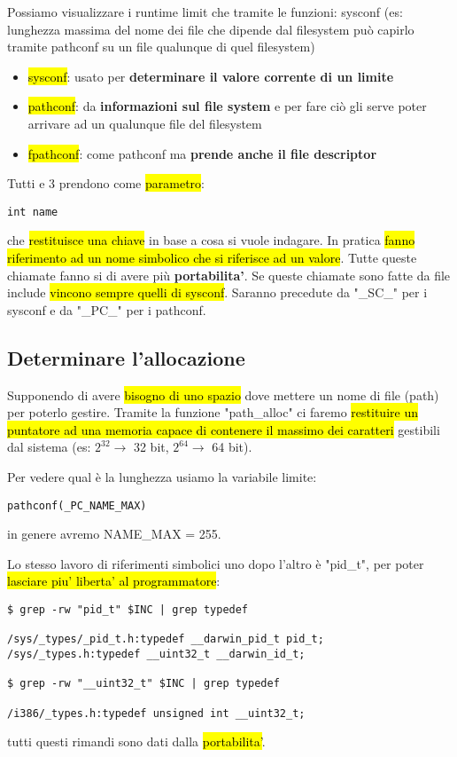 Possiamo visualizzare i runtime limit che tramite le funzioni: sysconf (es: lunghezza massima del nome dei file che dipende dal filesystem può capirlo tramite pathconf su un file qualunque di quel filesystem)

\begin{itemize}
	\item \hl{sysconf}: usato per \textbf{determinare il valore corrente di un limite}
	
	\item \hl{pathconf}: da \textbf{informazioni sul file system} e per fare ciò gli serve poter arrivare ad un qualunque file del filesystem
	
	\item \hl{fpathconf}: come pathconf ma \textbf{prende anche il file descriptor}
\end{itemize}

Tutti e 3 prendono come \hl{parametro}:

\begin{lstlisting}
int name
\end{lstlisting}

che \hl{restituisce una chiave} in base a cosa si vuole indagare. In pratica \hl{fanno riferimento ad un nome simbolico che si riferisce ad un valore}.
Tutte queste chiamate fanno si di avere più \textbf{portabilita'}. Se queste chiamate sono fatte da file include \hl{vincono sempre quelli di sysconf}. Saranno precedute da "\_SC\_" per i sysconf e da "\_PC\_" per i pathconf.


\subsection{Determinare l'allocazione}

Supponendo di avere \hl{bisogno di uno spazio} dove mettere un nome di file (path) per poterlo gestire. Tramite la funzione "path\_alloc" ci faremo \hl{restituire un puntatore ad una memoria capace di contenere il massimo dei caratteri} gestibili dal sistema (es: $2^32 \to$ 32 bit, $2^64 \to$ 64 bit).

Per vedere qual è la lunghezza usiamo la variabile limite:

\begin{lstlisting}
pathconf(_PC_NAME_MAX)
\end{lstlisting}

in genere avremo NAME\_MAX = 255.

Lo stesso lavoro di riferimenti simbolici uno dopo l'altro è "pid\_t", per poter \hl{lasciare piu' liberta' al programmatore}:

\begin{lstlisting}
$ grep -rw "pid_t" $INC | grep typedef

/sys/_types/_pid_t.h:typedef __darwin_pid_t pid_t;
/sys/_types.h:typedef __uint32_t __darwin_id_t;

$ grep -rw "__uint32_t" $INC | grep typedef

/i386/_types.h:typedef unsigned int __uint32_t;
\end{lstlisting}

tutti questi rimandi sono dati dalla \hl{portabilita'}.
